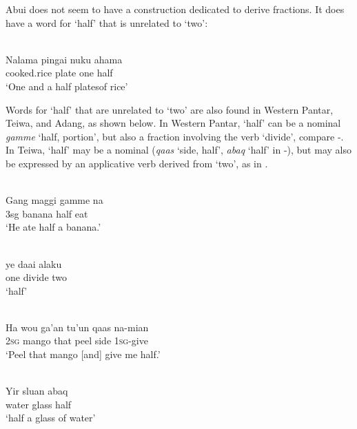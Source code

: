 \documentclass[output=paper]{LSP/langsci}
\begin{document}
 

Abui does not seem to have a construction dedicated to derive fractions. It does have a word for `half' that is unrelated to `two':  


\ea
\label{ex:8:1249}
\\
 \gll   Nalama  pingai  nuku  ahama   \\
    cooked.rice  plate  one  half   \\
 \glt  `One and a half platesof rice'  
\z

 
Words for `half' that are unrelated to `two' are also found in Western Pantar,  Teiwa, and Adang, as shown below.  In Western Pantar, `half' can be a nominal \textit{gamme} `half, portion', but also a fraction involving the verb `divide', compare -. In Teiwa, `half' may be a nominal (\textit{qaas} `side, half', \textit{abaq} `half' in -), but may also be expressed by an applicative verb derived from `two', as in .


\ea%
\label{bkm:Ref342746707}
\\
\gll   Gang  maggi  gamme  na  \\  
      3sg  banana  half  eat  \\
\glt  `He ate half a banana.'
\z








\ea%
\label{bkm:Ref342746708}
\\
\gll  ye  daai  alaku   \\  
    one  divide  two    \\
\glt  `half' 
\z








\ea%
\label{bkm:Ref342746924}
\\
\gll  Ha  wou  ga'an  tu'un  qaas  na-mian \\  
     \textsc{2sg } mango  that  peel  side  \textsc{1sg}{}-give \\
\glt  `Peel that mango [and] give me half.'
\z








\ea%
\label{bkm:Ref342746926}
\\
\gll   Yir  sluan  abaq   \\  
    water  glass  half      \\
\glt  `half a glass of water'
\z
\end{document}

